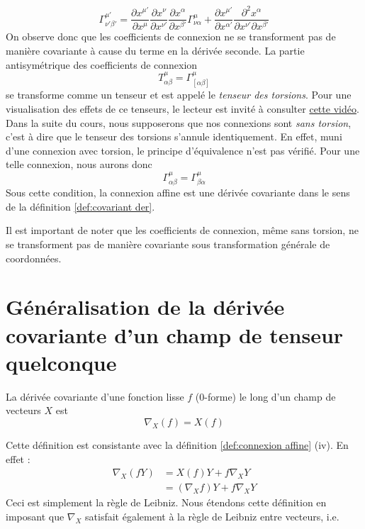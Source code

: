 \begin{equation}
    \boxed{\Gamma^{\mu '}_{\nu '\beta '} = \frac{\partial x^{\mu'}}{\partial x^{\mu}}\frac{\partial x^{\nu}}{\partial x^{\nu '}}\frac{\partial x^{\alpha}}{\partial x^{\beta '}} \Gamma^{\mu}_{\nu \alpha} +\frac{\partial x^{\mu '}}{\partial x^{\alpha '}}\frac{\partial ^2 x^{\alpha}}{\partial x^{\nu'}\partial x^{\beta '}} }
\end{equation}
On observe donc que les coefficients de connexion ne se transforment pas de manière covariante à cause du terme en la dérivée seconde. La partie antisymétrique des coefficients de connexion
\begin{equation}
    T^\mu_{\alpha\beta} = \Gamma^\mu_{[\alpha\beta]}
\end{equation}
se transforme comme un tenseur et est appelé le \emph{tenseur des torsions}. Pour une visualisation des effets de ce tenseurs, le lecteur est invité à consulter \href{https://www.youtube.com/watch?v=SfOiOPuS2_U}{cette vidéo}. Dans la suite du cours, nous supposerons que nos connexions sont \emph{sans torsion}, c'est à dire que le tenseur des torsions s'annule identiquement. En effet, muni d'une connexion avec torsion, le principe d'équivalence n'est pas vérifié. Pour une telle connexion, nous aurons donc
\begin{equation}
    \Gamma^\mu_{\alpha\beta} = \Gamma^\mu_{\beta \alpha}
\end{equation}
Sous cette condition, la connexion affine est une dérivée covariante dans le sens de la définition \ref{def:covariant der}.
\begin{rmk}
    Il est important de noter que les coefficients de connexion, même sans torsion, ne se transforment pas de manière covariante sous transformation générale de coordonnées. 
\end{rmk}



\section{Généralisation de la dérivée covariante d'un champ de tenseur quelconque}
\begin{theoremframe}
    \begin{defi}
        La dérivée covariante d'une fonction lisse $f$ ($0$-forme) le long d'un champ de vecteurs $X$ est 
        \begin{equation}
            \nabla_{X}(f) = X(f)
            \label{dérivée covariante 0-forme}
        \end{equation}
    \end{defi}
\end{theoremframe}
Cette définition est consistante avec la définition \ref{def:connexion affine} (iv). En effet :
\begin{align*}
        \nabla_{X}(fY) &= X(f)Y + f\nabla_X Y\\
        &= (\nabla_X f)Y + f\nabla_X Y
    \label{regle de Liebniz}
\end{align*}
Ceci est simplement la règle de Leibniz. Nous étendons cette définition en imposant que $\nabla_X$ satisfait également à la règle de Leibniz entre vecteurs, i.e.

